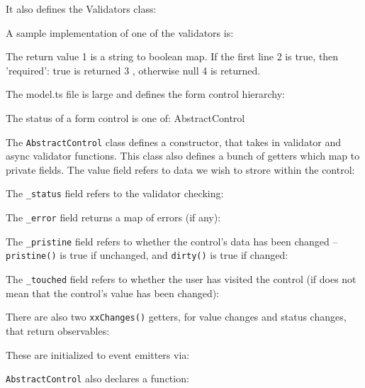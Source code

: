 It also defines the Validators class:



A sample implementation of one of the validators is:



The return value
1
is a string to boolean map. If the first line
2
is true, then
{'required': true} is returned
3
, otherwise null
4
is returned.

The model.ts file is large and defines the form control hierarchy:

The status of a form control is one of:
AbstractControl



The
\texttt{AbstractControl}
class defines a constructor, that takes in validator and async
validator functions. This class also defines a bunch of getters which map to private
fields. The value field refers to data we wish to strore within the control:



The
\texttt{\_status}
field refers to the validator checking:



The
\texttt{\_error}
field returns a map of errors (if any):



The
\texttt{\_pristine}
field refers to whether the control’s data has been changed –
\texttt{pristine()}
is true if unchanged, and
\texttt{dirty()}
is true if changed:



The
\texttt{\_touched}
field refers to whether the user has visited the control (if does not
mean that the control’s value has been changed):



There are also two
\texttt{xxChanges()}
getters, for value changes and status changes, that
return observables:



These are initialized to event emitters via:



\texttt{AbstractControl}
also declares a function:

